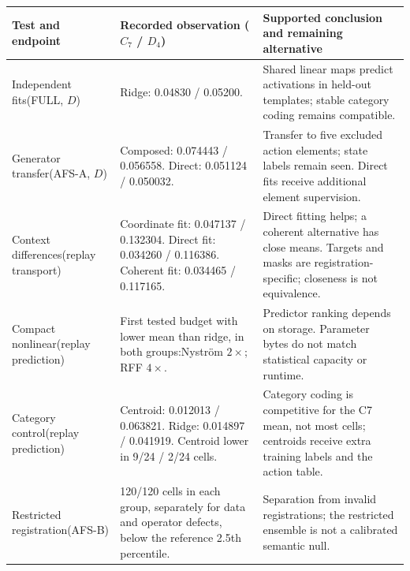 \begin{table}[t]
\centering\small
\setlength{\tabcolsep}{4pt}
\renewcommand{\arraystretch}{1.10}
\begin{tabular}{@{}p{}p{}p{}@{}}
\toprule
Test and endpoint & Recorded observation ($C_7$ / $D_4$) & Supported conclusion and remaining alternative \\
\midrule
Independent fits\newline (FULL, $D$) & Ridge: 0.04830 / 0.05200. & Shared linear maps predict activations in held-out templates; stable category coding remains compatible. \\
\addlinespace[3pt]
Generator transfer\newline (AFS-A, $D$) & Composed: 0.074443 / 0.056558. \newline Direct: 0.051124 / 0.050032. & Transfer to five excluded action elements; state labels remain seen. Direct fits receive additional element supervision. \\
\addlinespace[3pt]
Context differences\newline (replay transport) & Coordinate fit: 0.047137 / 0.132304. \newline Direct fit: 0.034260 / 0.116386. \newline Coherent fit: 0.034465 / 0.117165. & Direct fitting helps; a coherent alternative has close means. Targets and masks are registration-specific; closeness is not equivalence. \\
\addlinespace[3pt]
Compact nonlinear\newline (replay prediction) & First tested budget with lower mean than ridge, in both groups:\newline Nystr\"om $2\times$; RFF $4\times$. & Predictor ranking depends on storage. Parameter bytes do not match statistical capacity or runtime. \\
\addlinespace[3pt]
Category control\newline (replay prediction) & Centroid: 0.012013 / 0.063821. \newline Ridge: 0.014897 / 0.041919. \newline Centroid lower in 9/24 / 2/24 cells. & Category coding is competitive for the C7 mean, not most cells; centroids receive extra training labels and the action table. \\
\addlinespace[3pt]
Restricted registration\newline (AFS-B) & 120/120 cells in each group, separately for data and operator defects, below the reference 2.5th percentile. & Separation from invalid registrations; the restricted ensemble is not a calibrated semantic null. \\

\end{tabular}
\end{table}
